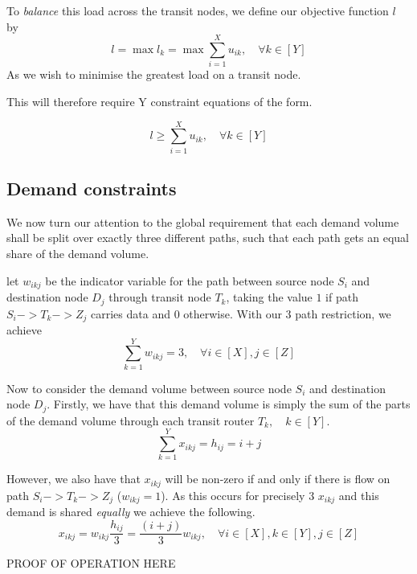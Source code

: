 \documentclass[12pt,twoside]{article}
\begin{document}
To \emph{balance} this load across the transit nodes, we define our objective function $l$ by
\begin{equation*}
 l = \max{l_k} = \max{\sum_{i=1}^{X}u_{ik}},   \quad  \forall k \in [Y]
\end{equation*}
As we wish to minimise the greatest load on a transit node.

This will therefore require Y constraint equations of the form.

\begin{equation}
	l \geq \sum_{i=1}^{X}u_{ik},   \quad  \forall k \in [Y]
\end{equation}



\subsection{Demand constraints}
We now turn our attention to the global requirement that each demand volume shall be split over exactly three different paths, such that each path gets an equal
share of the demand volume.

let $w_{ikj}$ be the indicator variable for the path between source node $S_i$ and destination node $D_j$ through transit node $T_k$, taking the value $1$ if path $S_i->T_k->Z_j$ carries data and $0$ otherwise. With our 3 path restriction, we achieve
\begin{equation}
	\sum_{k=1}^{Y}w_{ikj} = 3,   \quad  \forall i \in [X],j \in [Z]
\end{equation}

Now to consider the demand volume between source node $S_i$ and destination node $D_j$. Firstly, we have that this demand volume is simply the sum of the parts of the demand volume through each transit router $T_k,\quad k \in [Y]$.
\begin{equation*}
	\sum_{k=1}^{Y}x_{ikj} = h_{ij}=i+j
\end{equation*}

However, we also have that $x_{ikj}$ will be non-zero if and only if there is flow on path $S_i->T_k->Z_j$ ($w_{ikj} = 1$). As this occurs for precisely 3 $x_{ikj}$ and this demand is shared \emph{equally} we achieve the following.
\begin{equation}
	x_{ikj} = w_{ikj} \frac{h_{ij}}{3} = \frac{(i + j)}{3}w_{ikj},\quad  \forall i \in [X],k \in [Y],j \in [Z]
\end{equation}

PROOF OF OPERATION HERE
\end{document}
